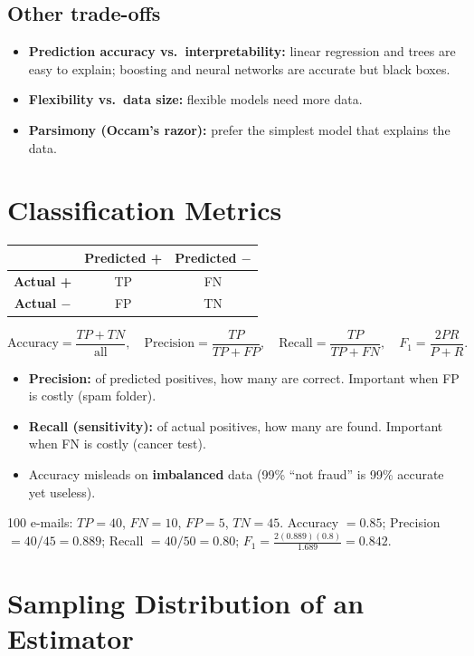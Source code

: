 \subsection{Other trade-offs}
\begin{itemize}
  \item \textbf{Prediction accuracy vs.\ interpretability:} linear regression and trees are easy to explain; boosting and neural networks are accurate but black boxes.
  \item \textbf{Flexibility vs.\ data size:} flexible models need more data.
  \item \textbf{Parsimony (Occam's razor):} prefer the simplest model that explains the data.
\end{itemize}

\section{Classification Metrics}
\begin{center}
\small
\begin{tabular}{@{}c|cc@{}}
 & \textbf{Predicted +} & \textbf{Predicted $-$}\\ \hline
\textbf{Actual +} & TP & FN\\
\textbf{Actual $-$} & FP & TN\\
\end{tabular}
\end{center}
\[
\text{Accuracy}=\frac{TP+TN}{\text{all}},\quad \text{Precision}=\frac{TP}{TP+FP},\quad \text{Recall}=\frac{TP}{TP+FN},\quad F_1=\frac{2PR}{P+R}.
\]
\begin{itemize}
  \item \textbf{Precision:} of predicted positives, how many are correct. Important when FP is costly (spam folder).
  \item \textbf{Recall (sensitivity):} of actual positives, how many are found. Important when FN is costly (cancer test).
  \item Accuracy misleads on \textbf{imbalanced} data (99\% ``not fraud'' is 99\% accurate yet useless).
\end{itemize}

\begin{numer}
100 e-mails: $TP=40$, $FN=10$, $FP=5$, $TN=45$. Accuracy $=0.85$; Precision $=40/45=0.889$; Recall $=40/50=0.80$; $F_1=\frac{2(0.889)(0.8)}{1.689}=0.842$.
\end{numer}

\section{Sampling Distribution of an Estimator}

